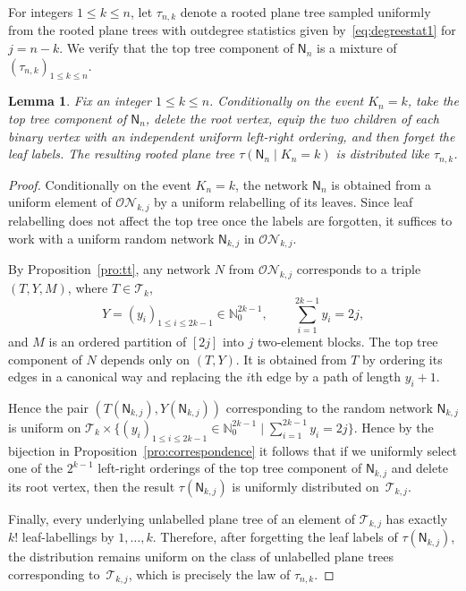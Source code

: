 \documentclass[english,11pt]{smfart}
\newcommand{\ndN}{\mathbb{N}}
\newcommand{\cN}{\mathcal{N}}
\newcommand{\cO}{\mathcal{O}}
\newcommand{\cT}{\mathcal{T}}
\newcommand{\mN}{\mathsf{N}}
\newtheorem{lemma}[theorem]{Lemma}
\numberwithin{equation}{section}
\begin{document}
For integers $1\le k\le n$, let $\tau_{n,k}$ denote a rooted plane tree sampled uniformly from the rooted plane trees with outdegree statistics given by~\eqref{eq:degreestat1} for $j=n-k$. We verify that the top tree component of $\mN_n$ is a mixture of $(\tau_{n,k})_{1 \le k \le n}$.

\begin{lemma}
	\label{le:conditioned-tree}
	Fix an integer $1 \le k \le n$. Conditionally on the event $K_n = k$, take the top tree component of $\mN_n$, delete the root vertex, equip the two children of each binary vertex with an independent uniform left-right ordering, and then forget the leaf labels. The resulting rooted plane tree $\tau(\mN_n \mid K_n =k)$ is distributed like $\tau_{n,k}$.
\end{lemma}

\begin{proof}
	Conditionally on the event $K_n=k$, the network $\mN_n$ is obtained from a uniform element of $\cO\cN_{k,j}$ by a uniform relabelling of its leaves. Since leaf relabelling does not affect the top tree once the labels are forgotten, it suffices to work with a uniform random network $\mN_{k,j}$ in $\cO\cN_{k,j}$.
	\smallskip
    
	By Proposition~\ref{pro:tt}, any network $N$ from $\cO\cN_{k,j}$  corresponds  to a triple $(T,Y,M)$, where $T\in\cT_k$, 
	\[
		Y=(y_i)_{1\le i\le 2k-1}\in \ndN_0^{2k-1}, \qquad \sum_{i=1}^{2k-1} y_i = 2j,
	\]
	and  $M$ is an ordered partition of $[2j]$ into $j$ two-element blocks. The top tree component of $N$ depends only on $(T,Y)$. It is obtained from $T$ by ordering its edges in a canonical way and replacing the $i$th edge by a path of length $y_i + 1$.
	\smallskip

	Hence the pair $(T(\mN_{k,j}),Y(\mN_{k,j}))$ corresponding to the random network $\mN_{k,j}$ is uniform on $\cT_{k} \times \{(y_i)_{1 \le i \le 2k-1} \in \ndN_0^{2k-1} \mid \sum_{i=1}^{2k-1} y_i = 2j\}$. Hence by the bijection in Proposition~\ref{pro:correspondence} it follows that if we uniformly select one of the $2^{k-1}$ left-right orderings of the top tree component of $\mN_{k,j}$ and delete its root vertex, then the result $\tau(\mN_{k,j})$ is uniformly distributed on~$\cT_{k,j}$.
	\smallskip
    
	Finally, every underlying unlabelled plane tree of an element of $\cT_{k,j}$ has exactly $k!$ leaf-labellings by $1, \dots, k$. Therefore, after forgetting the leaf labels of $\tau(\mN_{k,j})$, the distribution remains uniform on the class of unlabelled plane trees corresponding to~$\cT_{k,j}$, which is precisely the law of $\tau_{n,k}$.
\end{proof}
\end{document}
